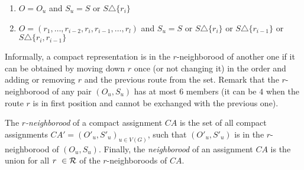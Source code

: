  \begin{enumerate} 
 \item $O = O_u$ and $S_u = S$ or $S \triangle \{r_i\}$  
 \item $O = (r_1,\dots,r_{i-2},r_{i},r_{i-1},\dots,r_{l})$ and $S_u = S$ or $S \triangle \{r_i\}$ or  $S \triangle \{r_{i-1}\}$ or $S \triangle \{r_i,r_{i-1}\}$ 
 \end{enumerate}

Informally, a compact representation is in the $r$-neighborood of another one if it can be obtained by 
moving down $r$ once (or not changing it) in the order and adding or removing $r$ and the previous route from the set. 
Remark that the $r$-neighborood of any pair $(O_u,S_u)$ has at most $6$ members (it can be $4$ when the route $r$ is in first position and cannot be exchanged with the previous one). 

The \emph{$r$-neighborood} of a compact assignment $CA$ is the set of all compact assignments $CA'=(O'_u,S'_u)_{u \in V(G)}$, such that  $(O'_u,S'_u)$ is in the $r$-neighborood of $(O_u,S_u)$. Finally, the \emph{neighborood} of an assignment $CA$ is the union for all $r \in \cal{R}$ of the $r$-neighboroods of $CA$.

% 
% 
% 
% 
% 

